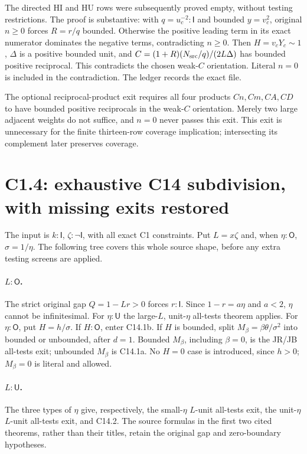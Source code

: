 \documentclass[11pt]{article}
\newcommand{\I}{\mathsf I}
\newcommand{\U}{\mathsf U}
\newcommand{\Otype}{\mathsf O}
\begin{document}
The directed HI and HU rows were subsequently proved empty, without
testing restrictions. The proof is substantive: with $q=u_c^{-2}:\I$
and bounded $y=v_c^2$, original $n\ge0$ forces $R=r/q$ bounded.
Otherwise the positive leading term in its exact numerator dominates
the negative terms, contradicting $n\ge0$. Then $H=v_cY_c\sim1$,
$\Delta$ is a positive bounded unit, and
$C=(1+R)(N_{\rm src}/q)/(2L\Delta)$ has bounded positive reciprocal.
This contradicts the chosen weak-$C$ orientation. Literal $n=0$ is
included in the contradiction. The ledger records the exact file.

The optional reciprocal-product exit requires all four products
$Cn,Cm,CA,CD$ to have bounded positive reciprocals in the weak-$C$
orientation. Merely two large adjacent weights do not suffice, and
$n=0$ never passes this exit. This exit is unnecessary for the finite
thirteen-row coverage implication; intersecting its complement later
preserves coverage.

\section{C1.4: exhaustive C14 subdivision, with missing exits restored}

The input is $k:\I$, $\zeta:\neg\I$, with all exact C1 constraints.
Put $L=x\zeta$ and, when $\eta:\Otype$, $\sigma=1/\eta$.
The following tree covers this whole source shape, before any extra
testing screens are applied.

\paragraph{$L:\Otype$.}
The strict original gap $Q=1-Lr>0$ forces $r:\I$.
Since $1-r=a\eta$ and $a<2$, $\eta$ cannot be infinitesimal.
For $\eta:\U$ the large-$L$, unit-$\eta$ all-tests theorem applies.
For $\eta:\Otype$, put $H=h/\sigma$. If $H:\Otype$, enter C14.1b.
If $H$ is bounded, split
$M_\beta=\beta\theta/\sigma^2$ into bounded or unbounded, after
$d=1$. Bounded $M_\beta$, including $\beta=0$, is the JR/JB all-tests
exit; unbounded $M_\beta$ is C14.1a. No $H=0$ case is introduced,
since $h>0$; $M_\beta=0$ is literal and allowed.

\paragraph{$L:\U$.}
The three types of $\eta$ give, respectively, the small-$\eta$
$L$-unit all-tests exit, the unit-$\eta$ $L$-unit all-tests exit, and
C14.2. The source formulas in the first two cited theorems, rather than
their titles, retain the original gap and zero-boundary hypotheses.
\end{document}
